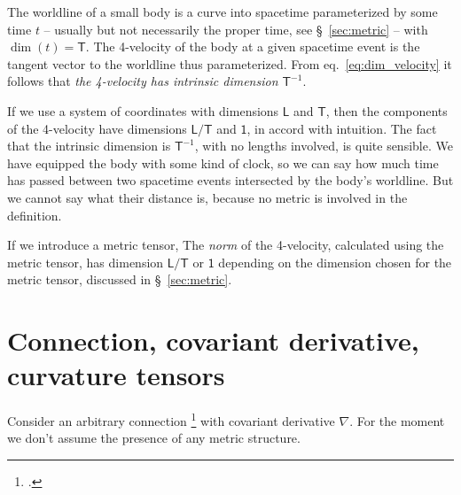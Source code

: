 \documentclass[\ifafour a4paper,12pt,\else a5paper,10pt,\fi%
onecolumn,oneside,article,%
british%
]{memoir}
\theoremstyle{remark}
\theoremstyle{innote}
\newcommand*{\citep}{\footcites}
\renewcommand*{\|}[1][]{\nonscript\,#1\vert\nonscript\;\mathopen{}}
\newcommand*{\sect}{\S}%
\newcommand*{\eqn}{eq.}%
\newcommand*{\Un}{\textsf{1}}
\newcommand*{\Le}{\textsf{L}}
\newcommand*{\Ti}{\textsf{T}}
\newcommand*{\nab}{\nabla}
\begin{document}
\medskip

The worldline of a small body is a curve into spacetime parameterized by
some time $t$ -- usually but not necessarily the proper time, see
\sect~\ref{sec:metric} -- with $\dim(t) = \Ti$. The 4-velocity of the body
at a given spacetime event is the tangent vector to the worldline thus
parameterized. From \eqn~\eqref{eq:dim_velocity} it follows that \emph{the
  4-velocity has intrinsic dimension \textnormal{$\Ti^{-1}$}}.

If we use a system of coordinates with dimensions $\Le$ and $\Ti$, then the
components of the 4-velocity have dimensions $\Le/\Ti$ and $\Un$, in accord
with intuition. The fact that the intrinsic dimension is $\Ti^{-1}$, with
no lengths involved, is quite sensible. We have equipped the body with some
kind of clock, so we can say how much time has passed between two spacetime
events intersected by the body's worldline. But we cannot say what their
distance is, because no metric is involved in the definition.

If we introduce a metric tensor, The \emph{norm} of the 4-velocity,
calculated using the metric tensor, has dimension $\Le/\Ti$ or $\Un$
depending on the dimension chosen for the metric tensor, discussed in
\sect~\ref{sec:metric}.






\section{Connection, covariant derivative, curvature tensors}
\label{sec:connection}

Consider an arbitrary connection
\citep[\sect~V.B]{choquetbruhatetal1977_r1996} with covariant derivative
$\nab$. For the moment we don't assume the presence of any metric
structure.
\end{document}

